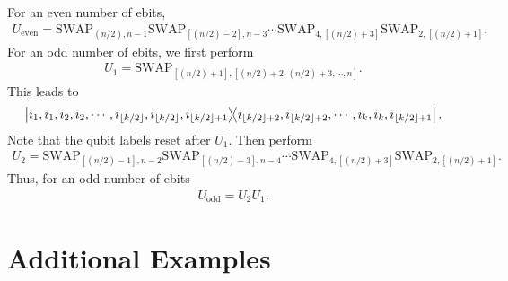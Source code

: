 \documentclass[12pt]{iopart}
\begin{document}
    For an even number of ebits,
    \begin{align}
        \label{Eq:n_divisible_by_4_unitary}
        U_{\text{even}} = \text{SWAP}_{(n/2), n-1} \text{SWAP}_{[(n/2)-2], n-3} \cdots \text{SWAP}_{4, [(n/2)+3]} \text{SWAP}_{2, [(n/2)+1]}.
    \end{align}
    For an odd number of ebits, we first perform 
    \begin{align}
        U_1=\text{SWAP}_{[(n/2)+1],[(n/2)+2,(n/2)+3,\cdots,n]}.
    \end{align} 
    This leads to 
    \begin{align}
        \op{i_1,i_1,i_2, i_2,\cdots, i_{\lfloor k/2 \rfloor}, i_{\lfloor k/2 \rfloor}, i_{\lfloor k/2 \rfloor +1}}{i_{\lfloor k/2 \rfloor +2},i_{\lfloor k/2 \rfloor +2},\cdots, i_{k}, i_{k}, i_{\lfloor k/2 \rfloor +1}}.
    \end{align}
    Note that the qubit labels reset after $U_1$. Then perform
    \begin{align}
        U_2 = \text{SWAP}_{[(n/2)-1], n-2} \text{SWAP}_{[(n/2)-3], n-4} \cdots \text{SWAP}_{4, [(n/2)+3]} \text{SWAP}_{2, [(n/2)+1]}.
    \end{align}
    Thus, for an odd number of ebits
    \begin{align} 
        U_{\text{odd}}=U_2U_1.
    \end{align}



\section{Additional Examples}
\label{App:4}
\end{document}
